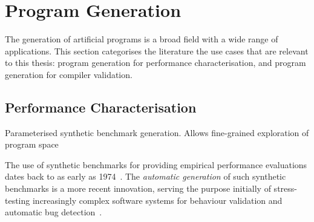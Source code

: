 \section{Program Generation}
\label{sec:related-work-generation}

The generation of artificial programs is a broad field with a wide range of applications. This section categorises the literature the use cases that are relevant to this thesis: program generation for performance characterisation, and program generation for compiler validation.

\subsection{Performance Characterisation}
\label{subsec:training-with-synthetic-benchmarks}

Parameterised synthetic benchmark generation. Allows fine-grained exploration of program space





 The use of synthetic benchmarks for providing empirical performance evaluations dates back to as early as 1974~\cite{Curnow1976}. The \emph{automatic generation} of such synthetic benchmarks is a more recent innovation, serving the purpose initially of stress-testing increasingly complex software systems for behaviour validation and automatic bug detection~\cite{Verplaetse2000,Godefroid2008}.

